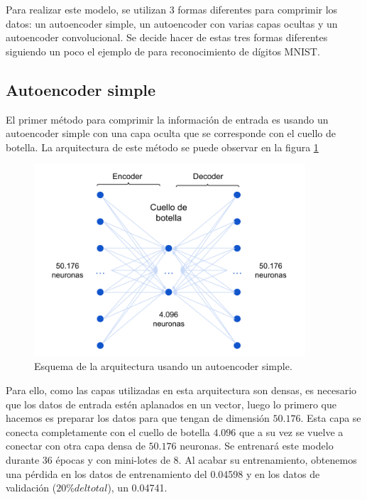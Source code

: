 Para realizar este modelo, se utilizan 3 formas diferentes para comprimir los datos: un autoencoder simple, un autoencoder con varias capas ocultas y un autoencoder convolucional. Se decide hacer de estas tres formas diferentes siguiendo un poco el ejemplo de \citep{aekeras} para reconocimiento de dígitos MNIST. 

\subsection{Autoencoder simple}

El primer método para comprimir la información de entrada es usando un autoencoder simple con una capa oculta que se corresponde con el cuello de botella. La arquitectura de este método se puede observar en la figura \ref{img: aeMMC}

\begin{figure}[h]
    \begin{center}
    \includegraphics[width=0.9\textwidth]{img/aeMMC.png}
    \end{center}
    \caption{Esquema de la arquitectura usando un autoencoder simple.}
    \label{img: aeMMC}
\end{figure}

Para ello, como las capas utilizadas en esta arquitectura son densas, es necesario que los datos de entrada estén aplanados en un vector, luego lo primero que hacemos es preparar los datos para que tengan de dimensión $50.176$. Esta capa se conecta completamente con el cuello de botella $4.096$ que a su vez se vuelve a conectar con otra capa densa de $50.176$ neuronas. Se entrenará este modelo durante 36 épocas y con mini-lotes de 8. Al acabar su entrenamiento, obtenemos una pérdida en los datos de entrenamiento del 0.04598 y en los datos de validación ($20\% del total$), un 0.04741. 


